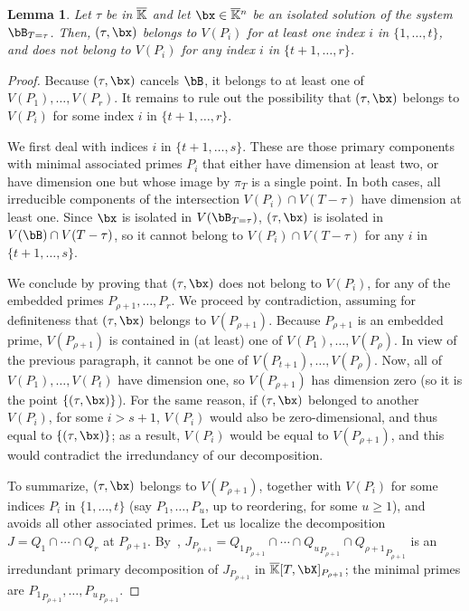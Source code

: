 \documentclass[12pt]{article}
\newtheorem{lemma}[definition]{Lemma}
\begin{document}
\begin{lemma}\label{lemma:vPi}
  Let $\tau$ be in $\overline{\mathbb{K}}$ and let $\bx \in \KKbar{}^n$ be an isolated
  solution of the system $\bB_{T=\tau}$. Then, $(\tau,\bx)$ belongs to $V(P_i)$
  for at least one index $i$ in $\{1,\dots,t\}$, and does not belong
  to $V(P_i)$ for any index $i$ in $\{t+1,\dots,r\}$.
\end{lemma}
\begin{proof}
  Because $(\tau,\bx)$ cancels $\bB$, it belongs to at least one of
  $V(P_1),\dots,V(P_r)$. It remains to rule out the possibility that
  $(\tau,\bx)$ belongs to $V(P_i)$ for some index $i$ in
  $\{t+1,\dots,r\}$.

  We first deal with indices $i$ in $\{t+1,\dots,s\}$. These are those
  primary components with minimal associated primes $P_i$ that either
  have dimension at least two, or have dimension one but whose image
  by $\pi_T$ is a single point. In both cases, all irreducible
  components of the intersection $V(P_i)\cap V(T-\tau)$ have dimension
  at least one. Since $\bx$ is isolated in $V(\bB_{T=\tau})$, $(\tau,\bx)$ is
  isolated in $V(\bB)\cap V(T-\tau)$, so it cannot belong to
  $V(P_i)\cap V(T-\tau)$ for any $i$ in $\{t+1,\dots,s\}$.
  
  We conclude by proving that $(\tau,\bx)$ does not belong to $V(P_i)$,
  for any of the embedded primes $P_{\rho+1},\dots,P_r$. We proceed by
  contradiction, assuming for definiteness that $(\tau,\bx)$ belongs to
  $V(P_{\rho+1})$. Because $P_{\rho+1}$ is an embedded prime, $V(P_{\rho+1})$
  is contained in (at least) one of $V(P_1),\dots,V(P_\rho)$. In view of
  the previous paragraph, it cannot be one of
  $V(P_{t+1}),\dots,V(P_\rho)$.  Now, all of $V(P_1),\dots,V(P_t)$ have
  dimension one, so $V(P_{\rho+1})$ has dimension zero (so it is the point $\{(\tau,\bx)\}$). For the same
  reason, if $(\tau,\bx)$ belonged to another $V(P_i)$, for some $i >
  s+1$, $V(P_i)$ would also be zero-dimensional, and thus equal to $\{(\tau,\bx)\}$; as a result, $V(P_i)$
  would be equal to $V(P_{\rho+1})$, and this would contradict the
  irredundancy of our decomposition.
  
  To summarize, $(\tau,\bx)$ belongs to $V(P_{\rho+1})$, together with
  $V(P_i)$ for some indices $P_i$ in $\{1,\dots,t\}$ (say
  $P_1,\dots,P_u$, up to reordering, for some $u \ge 1$), and avoids
  all other associated primes.  Let us localize the decomposition
  $J=Q_1 \cap \cdots \cap Q_r$ at
  $P_{\rho+1}$. By~\cite[Proposition~4.9]{AtMc},
  $J_{P_{\rho+1}}={Q_1}_{P_{\rho+1}} \cap \cdots \cap {Q_u}_{P_{\rho+1}}\cap
  {Q_{\rho+1}}_{P_{\rho+1}}$ is an irredundant primary decomposition of
  $J_{P_{\rho+1}}$ in $\KKbar[T,\bX]_{P_{\rho+1}}$; the minimal primes are
  ${P_1}_{P_{\rho+1}},\dots,{P_u}_{P_{\rho+1}}$.


\end{proof}
\end{document}
